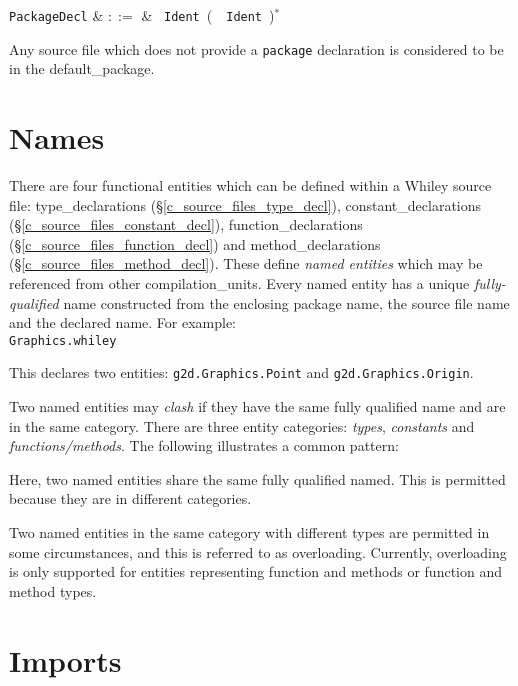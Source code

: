 \begin{syntax}
\verb+PackageDecl+ & $::=$ & \ \verb+Ident+\ \big(\ \ \verb+Ident+\ \big)$^*$\\
\end{syntax}

Any source file which does not provide a \lstinline{package} declaration is considered to be in the \gls{default_package}.

\section{Names}
\label{c_source_files_names}
There are four functional entities which can be defined within a Whiley source file: \gls{type_declaration}s (\S\ref{c_source_files_type_decl}), \gls{constant_declaration}s (\S\ref{c_source_files_constant_decl}), \gls{function_declaration}s (\S\ref{c_source_files_function_decl}) and \gls{method_declaration}s (\S\ref{c_source_files_method_decl}).  These define {\em named entities} which may be referenced from other \gls{compilation_unit}s.  Every named entity has a unique {\em fully-qualified} name constructed from the enclosing package name, the source file name and the declared name.  For example:\\

\noindent \verb+Graphics.whiley+



This declares two entities: \lstinline{g2d.Graphics.Point} and \lstinline{g2d.Graphics.Origin}.  

\noindent Two named entities may {\em clash} if they have the same fully qualified name and are in the same category.  There are three entity categories: {\em types}, {\em constants} and {\em functions/methods}.  The following illustrates a common pattern:



Here, two named entities share the same fully qualified named.  This is permitted because they are in different categories.

Two named entities in the same category with different types are permitted in some circumstances, and this is referred to as \gls{overloading}.  Currently, overloading is only supported for entities representing function and methods or function and method types.

\section{Imports}

